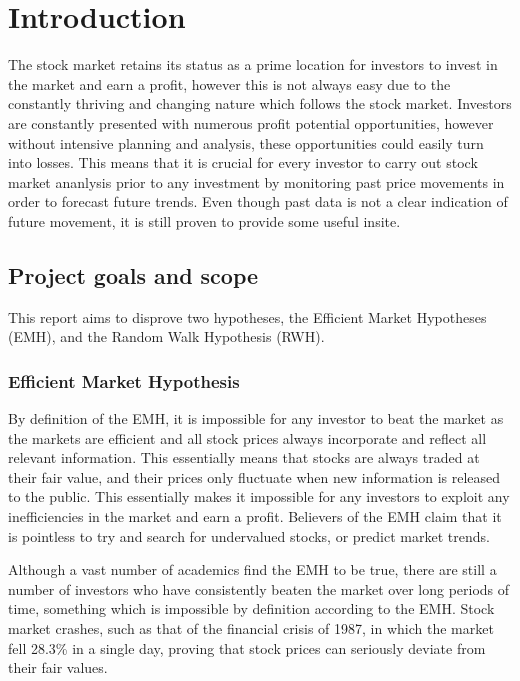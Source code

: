 \chapter{Introduction}

The stock market retains its status as a prime location for investors to invest in the market and earn a profit, however this is not always easy due to the constantly thriving and changing nature which follows the stock market. Investors are constantly presented with numerous profit potential opportunities, however without intensive planning and analysis, these opportunities could easily turn into losses. This means that it is crucial for every investor to carry out stock market ananlysis prior to any investment by monitoring past price movements in order to forecast future trends. Even though past data is not a clear indication of future movement, it is still proven to provide some useful insite. 

\section{Project goals and scope}

This report aims to disprove two hypotheses, the Efficient Market Hypotheses (EMH), and the Random Walk Hypothesis (RWH). 

\subsection{Efficient Market Hypothesis}

By definition of the EMH, it is impossible for any investor to beat the market as the markets are efficient and all stock prices always incorporate and reflect all relevant information. This essentially means that stocks are always traded at their fair value, and their prices only fluctuate when new information is released to the public. This essentially makes it impossible for any investors to exploit any inefficiencies in the market and earn a profit. Believers of the EMH claim that it is pointless to try and search for undervalued stocks, or predict market trends.

Although a vast number of academics find the EMH to be true, there are still a number of investors who have consistently beaten the market over long periods of time, something which is impossible by definition according to the EMH. Stock market crashes, such as that of the financial crisis of 1987, in which the market fell 28.3\% in a single day, proving that stock prices can seriously deviate from their fair values.  

